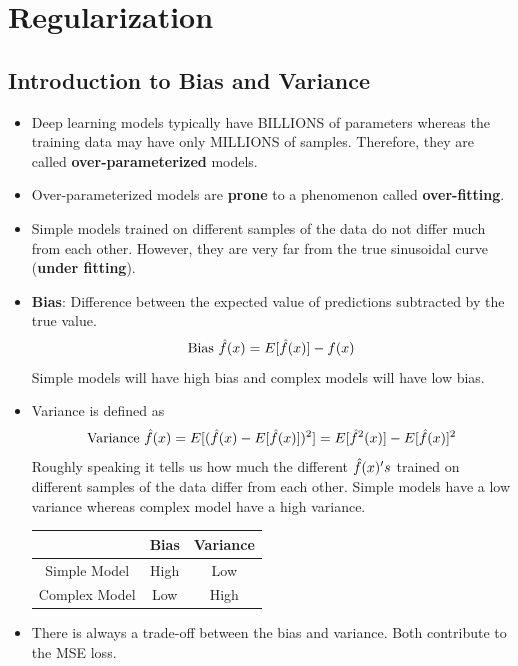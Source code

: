 \documentclass[a4paper]{article}
\begin{document}
\section{Regularization}
\subsection{Introduction to Bias and Variance}
\begin{itemize}
    \item Deep learning models typically have BILLIONS of parameters whereas the training data may have only MILLIONS of samples. Therefore, they are called \textbf{over-parameterized} models.
    \item Over-parameterized models are \textbf{prone} to a phenomenon called \textbf{over-fitting}.
    \item Simple models trained on different samples of the data do not differ much from each other. However, they are very far from the true sinusoidal curve (\textbf{under fitting}).
    \item \textbf{Bias}: Difference between the expected value of predictions subtracted by the true value.
    \begin{equation*}
        \text{Bias }\Hat{f}(x)=E[\Hat{f}(x)]-f(x)
    \end{equation*}
    Simple models will have high bias and complex models will have low bias.
    \item Variance is defined as
    \begin{equation*}
        \text{Variance }\Hat{f}(x)=E[(\Hat{f}(x)-E[\Hat{f}(x)])^2]=E[\Hat{f}^2(x)]-E[\Hat{f}(x)]^2
    \end{equation*}
    Roughly speaking it tells us how much the different $\Hat{f}(x)'s$ trained on different samples of the data differ from each other. Simple models have a low variance whereas complex model have a high variance.
    \begin{table}[H]
        \centering
        \begin{tabular}{|c|c|c|}
            \hline
             & Bias & Variance \\
             \hline
            Simple Model & High & Low \\
            \hline
            Complex Model & Low & High \\
            \hline
        \end{tabular}
    \end{table}
    \item There is always a trade-off between the bias and variance. Both contribute to the MSE loss.

\end{itemize}
\end{document}
